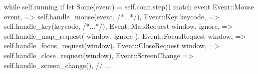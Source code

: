 \begin{rustblock}
  while self.running {
    if let Some(event) = self.conn.step() {
      match event {
        Event::Mouse { event, }
          => self.handle_mouse(event, /*...*/),
        Event::Key { keycode, }
          => self.handle_key(keycode, /*...*/),
        Event::MapRequest { window, ignore, }
          => self.handle_map_request(
            window, ignore
          ),
        Event::FocusRequest { window, }
          => self.handle_focus_request(window),
        Event::CloseRequest { window, }
          => self.handle_close_request(window),
        Event::ScreenChange
          => self.handle_screen_change(),
        // ...
      }
    }
  }
\end{rustblock}
